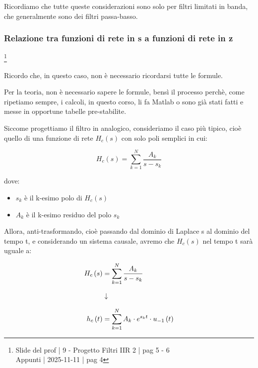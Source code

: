 Ricordiamo che tutte queste considerazioni sono solo per filtri limitati in banda, che generalmente sono dei filtri passa-basso. \newline 

\newpage 

\subsubsection{Relazione tra funzioni di rete in s a funzioni di rete in z}

\footnote{ 
    Slide del prof | 9 - Progetto Filtri IIR 2 | pag 5 - 6\\ 
    Appunti | 2025-11-11 | pag 4 
} 

\begin{tcolorbox}
    Ricordo che, in questo caso, non è necessario ricordarsi tutte le formule. \newline 

    Per la teoria, non è necessario sapere le formule, bensì il processo perchè, come ripetiamo sempre, i calcoli, in questo corso, 
    li fa Matlab o sono già stati fatti e messe in opportune tabelle pre-stabilite. 
\end{tcolorbox}

Siccome progettiamo il filtro in analogico, consideriamo il caso più tipico, cioè quello di una funzione di rete $H_c \left(s\right)$ con solo poli semplici in cui: 

{
    \Large 
    \begin{equation}
        H_c \left(s\right)
        = 
        \sum_{k = 1}^{N}
        \dfrac{A_k}{s - s_k}
    \end{equation}
}

dove: 

\begin{itemize}
    \item $s_k$ è il k-esimo polo di $H_c \left(s\right)$
    \item $A_k$ è il k-esimo residuo del polo $s_k$
\end{itemize}

Allora, anti-trasformando, cioè passando dal dominio di Laplace s al dominio del tempo t, e considerando un sistema causale, 
avremo che $H_c \left(s\right)$ nel tempo t sarà uguale a: 

{
    \Large 
    \begin{equation}
        \setlength{\jot}{10pt} %
        \begin{split}
        H_c \left(s\right)
        &= 
        \sum_{k = 1}^{N}
        \dfrac{A_k}{s - s_k}
        \\
        &\downarrow
        \\
        h_c \left(t\right)
        &= 
        \sum_{k = 1}^{N}
        A_k \cdot e^{s_k t}
        \cdot u_{-1} \left(t\right)
        \end{split}
    \end{equation}
}

